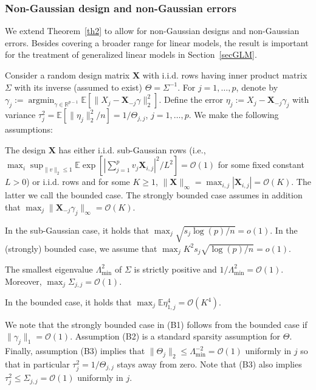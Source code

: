 \documentclass[aos,MSNbibl,dvips]{arximspdf}
\newcommand{\EE}{\mathbb{E}}
\newcommand{\R}{\mathbb{R}}
\newcommand{\bx}{\mathbf{X}}
\newcommand{\argmin}{\mathop{\arg\min}}
\begin{document}
\subsubsection{Non-Gaussian design and non-Gaussian errors}\label
{subsecsub-Gaussian}

We extend Theorem~\ref{th2} to allow for non-Gaussian designs and
non-Gaussian errors.
Besides
covering
a broader range for linear models, the result is important for
the treatment of generalized linear models in Section~\ref{secGLM}.

Consider a random design matrix $\bx$ with i.i.d. rows having inner
product matrix $\Sigma$ with its inverse (assumed to exist) $\Theta=
\Sigma^{-1}$. For
$j=1, \ldots, p$, denote by
$\gamma_j:= \argmin_{\gamma\in\R^{p-1} } \EE[\|X_j - \bx_{-j}
\gamma
\|_2^2]$.
Define the
error $\eta_j:= X_j - \bx_{-j} \gamma_j$ with variance $\tau_j^2 =
\EE[\|\eta_j\|_2^2/n] = 1/\Theta_{j,j}$, $j=1, \ldots, p$. We make
the following assumptions:
%
\begin{longlist}[(B1)]
%
\item[(B1)] The design $\bx$ has either
i.i.d. sub-Gaussian rows (i.e.,\break
$\max_i \sup_{\| v \|_2 \le1 } \EE \exp[ |\sum_{j=1}^p v_j \mathbf
{X}_{i,j}| ^2 / L^2 ]
= {\mathcal O} (1) $ for some fixed constant\break  $L >0$)
or i.i.d. rows and for some $K \ge1$, $\|\bx
\|_{\infty} = \max_{i,j}|\bx_{i,j}| = {\mathcal O}(K)$.
The latter we call the bounded case. The strongly bounded case assumes in
addition that $\max_j \| \bx_{-j} \gamma_j \|_{\infty} = {\mathcal
O}(K) $.

\item[(B2)] In the
sub-Gaussian case, it holds that
$ \max_j \sqrt{s_j \log(p)/ n } = o(1)$. In the (strongly) bounded
case, we assume
that $\max_j K^2 s_j \sqrt{\log(p)/ n } = o (1)$.

\item[(B3)] The smallest eigenvalue $\Lambda_{\mathrm{min}}^2$ of
$\Sigma$ is strictly
positive and $1/ \Lambda_{\mathrm{min}}^2 = {\mathcal O} (1) $.
Moreover, $\max_{j} \Sigma_{j,j} = {\mathcal O}(1)$.
%
\item[(B4)] In the bounded case, it holds that $\max_j \EE\eta
_{1,j}^{4} = {\mathcal O} (K^4)$.
\end{longlist}

We note that the strongly bounded case in (B1) follows from the
bounded case if $\| \gamma_j \|_1 = {\mathcal O} (1) $.
Assumption (B2) is a standard sparsity
assumption for $\Theta$. Finally, assumption (B3) implies that $\|
\Theta_j \|_2 \le\Lambda_{\mathrm{min}}^{-2} = {\mathcal
O} (1)$ uniformly in $j$ so that in particular
$\tau_j^2 = 1/ \Theta_{j,j}$ stays away from zero.
Note that (B3) also implies $\tau_j^2 \le\Sigma_{j,j} = {\mathcal
O}(1) $ uniformly in $j$.
\end{document}
